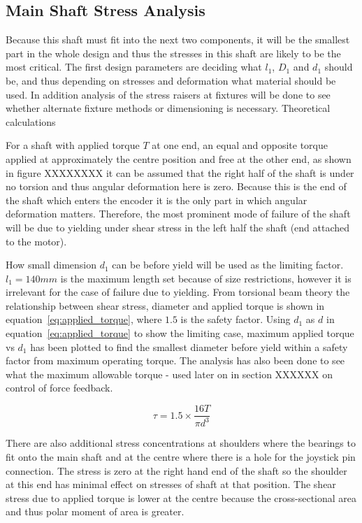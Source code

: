 
\subsection{Main Shaft Stress Analysis} %
\label{sub:main_shaft_stress_analysis}

Because this shaft must fit into the next two components, it will be the smallest part in the whole design and thus the stresses in this shaft are likely to be the most critical. The first design parameters are deciding what $l_1$, $D_1$ and $d_1$ should be, and thus depending on stresses and deformation what material should be used. In addition analysis of the stress raisers at fixtures will be done to see whether alternate fixture methods or dimensioning is necessary.
Theoretical calculations

For a shaft with applied torque $T$ at one end, an equal and opposite torque applied at approximately the centre position and free at the other end, as shown in figure XXXXXXXX it can be assumed that the right half of the shaft is under no torsion and thus angular deformation here is zero. Because this is the end of the shaft which enters the encoder it is the only part in which angular deformation matters. Therefore, the most prominent mode of failure of the shaft will be due to yielding under shear stress in the left half the shaft (end attached to the motor).

How small dimension $d_1$ can be before yield will be used as the limiting factor. $l_1 = 140 mm$ is the maximum length set because of size restrictions, however it is irrelevant for the case of failure due to yielding. From torsional beam theory the relationship between shear stress, diameter and applied torque is shown in equation~\ref{eq:applied_torque}, where $1.5$ is the safety factor. Using $d_1$ as $d$ in equation~\ref{eq:applied_torque} to show the limiting case, maximum applied torque vs $d_1$ has been plotted to find the smallest diameter before yield within a safety factor from maximum operating torque. The analysis has also been done to see what the maximum allowable torque - used later on in section XXXXXX on control of force feedback.

\begin{equation}
  \tau = 1.5 \times \frac{16 T}{\pi d^3}
  \label{eq:applied_torque}
\end{equation}

There are also additional stress concentrations at shoulders where the bearings to fit onto the main shaft and at the centre where there is a hole for the joystick pin connection. The stress is zero at the right hand end of the shaft so the shoulder at this end has minimal effect on stresses of shaft at that position. The shear stress due to applied torque is lower at the centre because the cross-sectional area and thus polar moment of area is greater.

